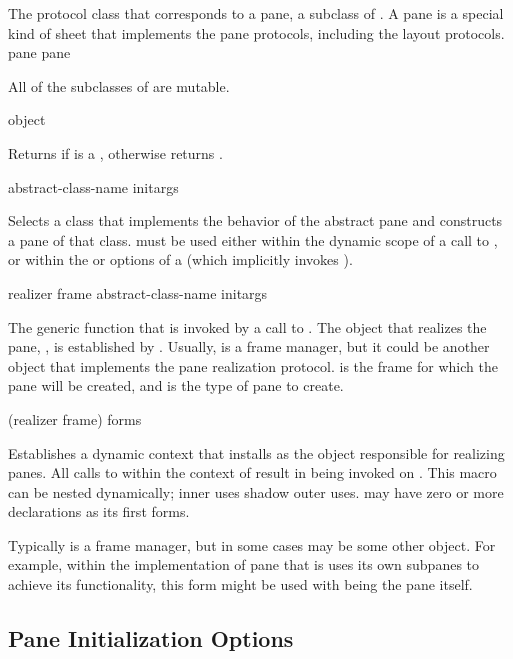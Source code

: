 
The protocol class that corresponds to a pane, a subclass of .  A pane
is a special kind of sheet that implements the pane protocols, including the
layout protocols.
 {pane} {pane}

All of the subclasses of  are mutable.

 {object}

Returns  if  is a , otherwise returns
.

 {abstract-class-name \rest initargs}

Selects a class that implements the behavior of the abstract pane
 and constructs a pane of that class.  
must be used either within the dynamic scope of a call to
, or within the  or 
options of a  (which implicitly invokes
).

 {realizer frame abstract-class-name \rest initargs}

The generic function that is invoked by a call to .  The object
that realizes the pane, , is established by
.  Usually,  is a frame
manager, but it could be another object that implements the pane realization
protocol.   is the frame for which the pane will be created, and
 is the type of pane to create.

 {(realizer frame) \body forms}

Establishes a dynamic context that installs  as the object
responsible for realizing panes.  All calls to  within the context
of  result in  being invoked
on .  This macro can be nested dynamically; inner uses shadow
outer uses.   may have zero or more declarations as its first forms.

Typically  is a frame manager, but in some cases 
may be some other object.  For example, within the implementation of pane that
is uses its own subpanes to achieve its functionality, this form might be used
with  being the pane itself.


\subsection {Pane Initialization Options}

